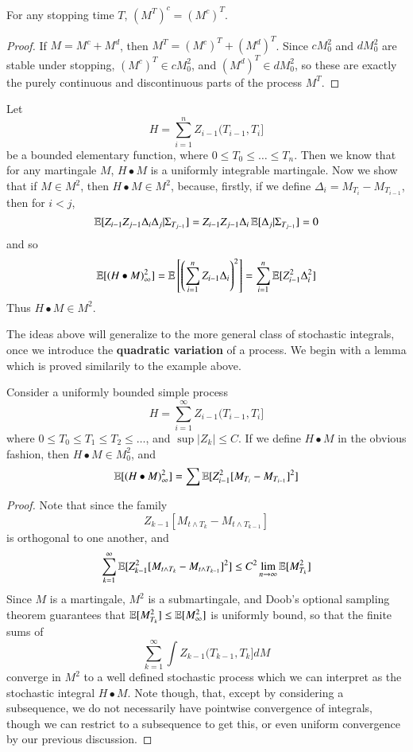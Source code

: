 \begin{theorem}
    For any stopping time $T$, $(M^T)^c = (M^c)^T$.
\end{theorem}
\begin{proof}
    If $M = M^c + M^d$, then $M^T = (M^c)^T + (M^d)^T$. Since $cM^2_0$ and $dM^2_0$ are stable under stopping, $(M^c)^T \in cM^2_0$, and $(M^d)^T \in dM^2_0$, so these are exactly the purely continuous and discontinuous parts of the process $M^T$.
\end{proof}

\begin{example}
    Let
    \[ H = \sum_{i = 1}^n Z_{i-1}(T_{i-1},T_i] \]
    be a bounded elementary function, where $0 \leq T_0 \leq \dots \leq T_n$. Then we know that for any martingale $M$, $H \bullet M$ is a uniformly integrable martingale. Now we show that if $M \in M^2$, then $H \bullet M \in M^2$, because, firstly, if we define $\Delta_i = M_{T_i} - M_{T_{i-1}}$, then for $i < j$,
    \[ \operatorname{\mathbb{E}}[Z_{i-1} Z_{j-1} \Delta_i \Delta_j | \Sigma_{T_{j-1}}] = Z_{i-1} Z_{j-1} \Delta_i \operatorname{\mathbb{E}}[\Delta_j | \Sigma_{T_{j-1}}] = 0 \]
    and so
    \[ \operatorname{\mathbb{E}}[(H \bullet M)_\infty^2] = \operatorname{\mathbb{E}} \left[ \left( \sum_{i = 1}^n Z_{i-1} \Delta_i \right)^2 \right] = \sum_{i = 1}^n \operatorname{\mathbb{E}} [Z_{i-1}^2 \Delta_i^2] \]
    Thus $H \bullet M \in M^2$.
\end{example}

The ideas above will generalize to the more general class of stochastic integrals, once we introduce the {\bf quadratic variation} of a process. We begin with a lemma which is proved similarily to the example above.

\begin{lemma}
    Consider a uniformly bounded simple process
    \[ H = \sum_{i = 1}^\infty Z_{i-1} (T_{i-1},T_i] \]
    where $0 \leq T_0 \leq T_1 \leq T_2 \leq \dots$, and $\sup |Z_k| \leq C$. If we define $H \bullet M$ in the obvious fashion, then $H \bullet M \in M^2_0$, and
    \[ \operatorname{\mathbb{E}}[(H \bullet M)_\infty^2] = \sum \operatorname{\mathbb{E}}[Z_{i-1}^2[M_{T_i} - M_{T_{i-1}}]^2] \]
\end{lemma}
\begin{proof}
    Note that since the family
    \[ Z_{k-1} [M_{t \wedge T_k} - M_{t \wedge T_{k-1}}] \]
    is orthogonal to one another, and
    \[ \sum_{k = 1}^\infty \operatorname{\mathbb{E}}[Z_{k-1}^2 [M_{t \wedge T_k} - M_{t \wedge T_{k-1}}]^2] \leq C^2 \lim_{n \to \infty} \operatorname{\mathbb{E}}[M_{T_k}^2] \]
    Since $M$ is a martingale, $M^2$ is a submartingale, and Doob's optional sampling theorem guarantees that $\operatorname{\mathbb{E}}[M_{T_k}^2] \leq \operatorname{\mathbb{E}}[M_\infty^2]$ is uniformly bound, so that the finite sums of
    \[ \sum_{k = 1}^\infty \int Z_{k-1} (T_{k-1}, T_k] dM \]
    converge in $M^2$ to a well defined stochastic process which we can interpret as the stochastic integral $H \bullet M$. Note though, that, except by considering a subsequence, we do not necessarily have pointwise convergence of integrals, though we can restrict to a subsequence to get this, or even uniform convergence by our previous discussion.
\end{proof}

